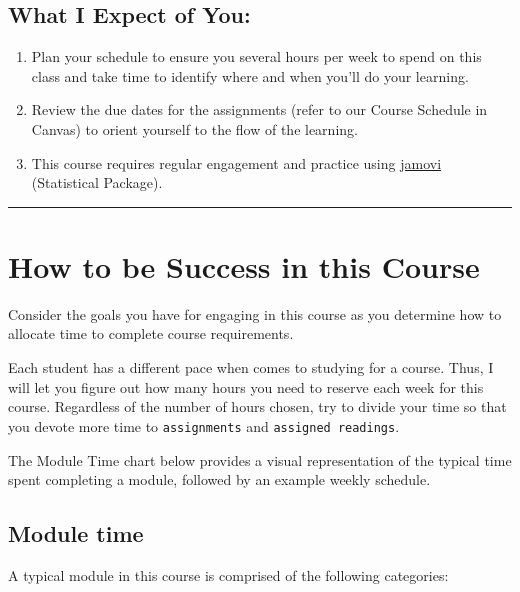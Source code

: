 \documentclass[11pt,]{article}
\providecommand{\tightlist}{%
  \setlength{\itemsep}{0pt}\setlength{\parskip}{0pt}}
\begin{document}
\hypertarget{what-i-expect-of-you}{%
\subsection{What I Expect of You:}\label{what-i-expect-of-you}}

\begin{enumerate}
\def\labelenumi{\arabic{enumi}.}
\tightlist
\item
  Plan your schedule to ensure you several hours per week to spend on
  this class and take time to identify where and when you'll do your
  learning.
\item
  Review the due dates for the assignments (refer to our Course Schedule
  in Canvas) to orient yourself to the flow of the learning.
\item
  This course requires regular engagement and practice using
  \protect\hyperlink{supplies}{jamovi} (Statistical Package).
\end{enumerate}

\begin{center}\rule{0.5\linewidth}{0.5pt}\end{center}

\hypertarget{how-to-be-success-in-this-course}{%
\section{How to be Success in this
Course}\label{how-to-be-success-in-this-course}}

Consider the goals you have for engaging in this course as you determine
how to allocate time to complete course requirements.

Each student has a different pace when comes to studying for a course.
Thus, I will let you figure out how many hours you need to reserve each
week for this course. Regardless of the number of hours chosen, try to
divide your time so that you devote more time to \texttt{assignments}
and \texttt{assigned\ readings}.

The Module Time chart below provides a visual representation of the
typical time spent completing a module, followed by an example weekly
schedule.

\hypertarget{module-time}{%
\subsection{Module time}\label{module-time}}

A typical module in this course is comprised of the following
categories:
\end{document}

